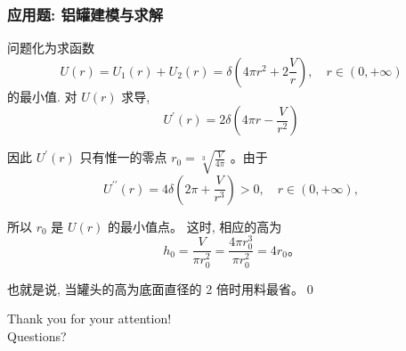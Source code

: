 \documentclass[
10pt,
aspectratio=43,
]{beamer}
\begin{document}
\begin{frame}
	\frametitle{应用题: 铝罐建模与求解}
	问题化为求函数
	$$
		U(r)=U_1(r)+U_2(r)=\delta\left(4 \pi r^2+2 \frac{V}{r}\right), \quad r \in(0,+\infty)
	$$
	的最小值.
	对 $U(r)$ 求导,
	$$
		U^{\prime}(r)=2 \delta\left(4 \pi r-\frac{V}{r^2}\right)
	$$

	因此 $U^{\prime}(r)$ 只有惟一的零点 $r_0=\sqrt[3]{\frac{V}{4 \pi}}$ 。由于
	$$
		U^{\prime \prime}(r)=4 \delta\left(2 \pi+\frac{V}{r^3}\right)>0, \quad r \in(0,+\infty),
	$$

	所以 $r_0$ 是 $U(r)$ 的最小值点。
	这时, 相应的高为
	$$
		h_0=\frac{V}{\pi r_0^2}=\frac{4 \pi r_0^3}{\pi r_0^2}=4 r_0 。
	$$

	也就是说, 当罐头的高为底面直径的 2 倍时用料最省。\qed
\end{frame}

\begin{frame}[plain]
	\vfill
	\centering
	{
		\centering \Huge \color{white} Thank you for your attention!\\[10pt]Questions?
	}
	\vfill
\end{frame}
\end{document}
